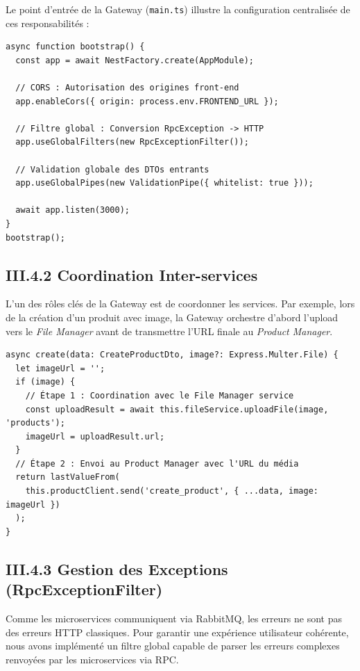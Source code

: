 Le point d'entrée de la Gateway (\texttt{main.ts}) illustre la configuration centralisée de ces responsabilités :

\begin{verbatim}
async function bootstrap() {
  const app = await NestFactory.create(AppModule);

  // CORS : Autorisation des origines front-end
  app.enableCors({ origin: process.env.FRONTEND_URL });

  // Filtre global : Conversion RpcException -> HTTP
  app.useGlobalFilters(new RpcExceptionFilter());

  // Validation globale des DTOs entrants
  app.useGlobalPipes(new ValidationPipe({ whitelist: true }));

  await app.listen(3000);
}
bootstrap();
\end{verbatim}

\subsection{III.4.2 Coordination Inter-services}
L'un des rôles clés de la Gateway est de coordonner les services. Par exemple, lors de la création d'un produit avec image, la Gateway orchestre d'abord l'upload vers le \textit{File Manager} avant de transmettre l'URL finale au \textit{Product Manager}.

\begin{verbatim}
async create(data: CreateProductDto, image?: Express.Multer.File) {
  let imageUrl = '';
  if (image) {
    // Étape 1 : Coordination avec le File Manager service
    const uploadResult = await this.fileService.uploadFile(image, 'products');
    imageUrl = uploadResult.url;
  }
  // Étape 2 : Envoi au Product Manager avec l'URL du média
  return lastValueFrom(
    this.productClient.send('create_product', { ...data, image: imageUrl })
  );
}
\end{verbatim}

\subsection{III.4.3 Gestion des Exceptions (RpcExceptionFilter)}
Comme les microservices communiquent via RabbitMQ, les erreurs ne sont pas des erreurs HTTP classiques. Pour garantir une expérience utilisateur cohérente, nous avons implémenté un filtre global capable de parser les erreurs complexes renvoyées par les microservices via RPC.

